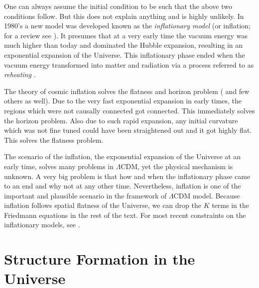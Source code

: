 One can always assume the initial condition to be such that the above two conditions
follow. But this does not explain anything and is highly unlikely. In 1980's 
a new model was developed known as the {\it inflationary model} (or inflation;
for a review see \cite{2001hep.ph....1119B,2003hep.ph....4257T,2006RvMP...78..537B}). It presumes
that at a very early time the vacuum energy was much higher than today and dominated
the Hubble expansion, resulting in an exponential expansion of the Universe. This 
inflationary phase ended when the vacuum energy transformed into
matter and radiation via a process referred to as {\it reheating \citep{2006RvMP...78..537B}}.

The theory of cosmic inflation solves the flatness and horizon problem (
and few others as well). Due to the very fast exponential expansion in early times, the
regions which were not causally connected got connected. This immediately solves
the horizon problem. Also due to such rapid expansion, any initial curvature which
was not fine tuned could have been straightened out and it got highly flat. This solves the
flatness problem. 

The scenario of the inflation, the exponential expansion of the Universe at 
an early time, solves many problems in $\Lambda$CDM, yet the physical mechanism
is unknown. A very big problem is that how and when the inflationary phase came
to an end and why not at any other time. Nevertheless, inflation is one of the
important and plausible scenario in the framework of $\Lambda$CDM model. Because
inflation follows spatial flatness  of the Universe, 
we can drop the $K$ terms in the Friedmann
equations in the rest of the text. For most recent constraints on 
the inflationary models, see \cite{2015arXiv150202114P}.

\section{Structure Formation in the Universe}

